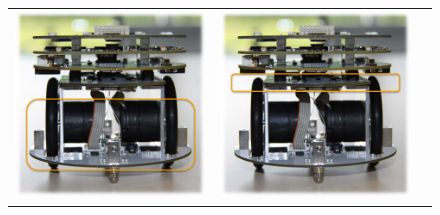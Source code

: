 \begin{figure}[htb]
\begin{center}
\begin{tabular}{ccc}
\includegraphics[scale=0.4]{Bilder/amiroDiWheel.png} &
\includegraphics[scale=0.4]{Bilder/amiroPower.png} &

\end{tabular}
\end{center}
\end{figure}
